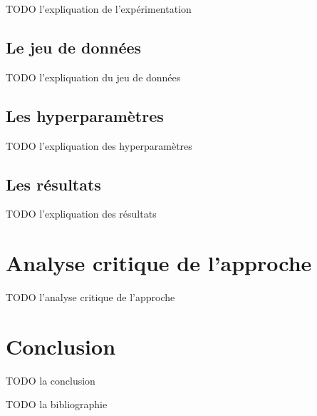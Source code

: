 \documentclass{article}
\begin{document}
TODO l'expliquation de l'expérimentation

\subsection{Le jeu de données}

TODO l'expliquation du jeu de données

\subsection{Les hyperparamètres}

TODO l'expliquation des hyperparamètres

\subsection{Les résultats}

TODO l'expliquation des résultats

\section{Analyse critique de l'approche}

TODO l'analyse critique de l'approche

\section{Conclusion}

TODO la conclusion





TODO la bibliographie
\end{document}
